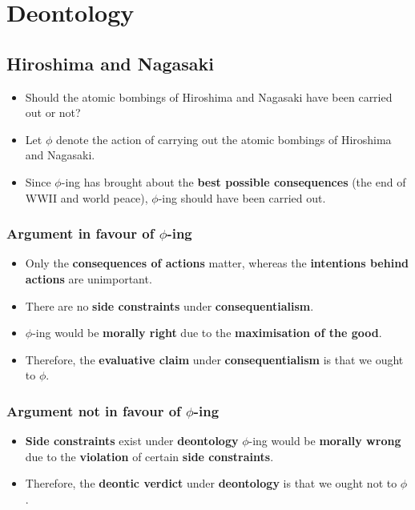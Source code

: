 \documentclass[11pt]{article}
\begin{document}
 \newpage
\section{Deontology}
\label{sec:org91008b1}

\subsection{Hiroshima and Nagasaki}
\label{sec:org0a0144d}
\begin{itemize}
\item Should the atomic bombings of Hiroshima and Nagasaki have been carried out or not?
\item Let \(\phi\) denote the action of carrying out the atomic bombings of Hiroshima and Nagasaki.
\item Since \(\phi\)-ing has brought about the \textbf{best possible consequences} (the end of WWII and world peace), \(\phi\)-ing should have been carried out.
\end{itemize}
\subsubsection{Argument in favour of \(\phi\)-ing}
\label{sec:orgdec39b1}
\begin{itemize}
\item Only the \textbf{consequences of actions} matter, whereas the \textbf{intentions behind actions} are unimportant.
\item There are no \textbf{side constraints} under \textbf{consequentialism}.
\item \(\phi\)-ing would be \textbf{morally right} due to the \textbf{maximisation of the good}.
\item Therefore, the \textbf{evaluative claim} under \textbf{consequentialism} is that we ought to \(\phi\).
\end{itemize}
\subsubsection{Argument not in favour of \(\phi\)-ing}
\label{sec:orgae2ea36}
\begin{itemize}
\item \textbf{Side constraints} exist under \textbf{deontology} \(\phi\)-ing would be \textbf{morally wrong} due to the \textbf{violation} of certain \textbf{side constraints}.
\item Therefore, the \textbf{deontic verdict} under \textbf{deontology} is that we ought not to \(\phi\).
\end{itemize}
\end{document}
